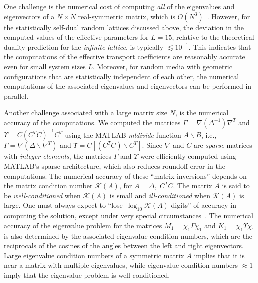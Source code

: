 \documentclass{cmslatex}
\begin{document}
One challenge is the numerical cost of computing \emph{all} of the
eigenvalues and eigenvectors of a $N\times N$ real-symmetric matrix, which
is $O(N^3)$~\cite{Demmel:1997}. However, for the statistically
self-dual random lattices discussed above, the deviation in the
computed 
values of the effective parameters for $L=15$, relative to the
theoretical duality prediction for the \emph{infinite lattice}, is
typically $\lesssim10^{-1}$. This indicates that the computations of the
effective transport coefficients are reasonably accurate even 
for small system sizes $L$. Moreover, for random media with geometric
configurations that are statistically independent of each other, the
numerical computations of the associated eigenvalues and eigenvectors
can be performed in parallel.






Another challenge associated with a large matrix size $N$, is the
numerical accuracy of the computations. We computed the matrices
$\Gamma=\nabla(\Delta^{-1})\nabla^T$ and $\Upsilon=C(C^TC)^{-1}C^T$ using the MATLAB
\emph{mldivide} function $A\backslash B$, i.e., $\Gamma=\nabla(\Delta\backslash \nabla^T)$ and
$\Upsilon=C[(C^TC)\backslash C^T]$. Since $\nabla$ and $C$ are \emph{sparse} matrices with
\emph{integer elements}, the matrices $\Gamma$ and $\Upsilon$ were efficiently
computed using MATLAB's sparse architecture, which also reduces roundoff
error in the computations. The numerical accuracy of these ``matrix
inversions'' depends on the matrix condition number $\mathcal{K}(A)$,
for $A=\Delta,\;C^TC$. The matrix $A$ is said to be
\emph{well-conditioned} when $\mathcal{K}(A)$ is small and
\emph{ill-conditioned} when $\mathcal{K}(A)$ is large. One must always
expect to ``lose $\,\log_{10}\mathcal{K}(A)$ digits'' of accuracy in
computing the solution, except under very special
circumstances~\cite{Trefethen:1997:NLA}. The numerical accuracy of the
eigenvalue 
problem for the matrices $M_1=\chi_1\Gamma\chi_1$ and $K_1=\chi_1\Upsilon\chi_1$ is also determined
by the associated eigenvalue condition numbers, which are the
reciprocals of the cosines of the angles between the left and right
eigenvectors. Large eigenvalue condition numbers of a symmetric matrix
$A$ implies that it is near a matrix with multiple eigenvalues, while
eigenvalue condition numbers $\approx1$ imply that the eigenvalue problem
is well-conditioned. 
\end{document}
